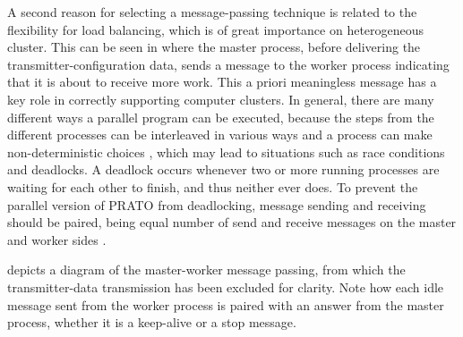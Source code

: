A second reason for selecting a message-passing technique is related
to the flexibility for load balancing, which is of great importance
on heterogeneous cluster. This can be seen in 
where the master process, before delivering the transmitter-configuration
data, sends a message to the worker process indicating that it is
about to receive more work. This a priori meaningless message has
a key role in correctly supporting computer clusters. In general,
there are many different ways a parallel program can be executed,
because the steps from the different processes can be interleaved
in various ways and a process can make non-deterministic choices \cite{Siegel_Verification_of_halting_properties_for_MPI_programs:2007},
which may lead to situations such as race conditions \cite{Clemencon_MPI_Race_detection:1995}
and deadlocks. A deadlock occurs whenever two or more running processes
are waiting for each other to finish, and thus neither ever does.
To prevent the parallel version of PRATO from deadlocking, message
sending and receiving should be paired, being equal number of send
and receive messages on the master and worker sides \cite{Siegel_Verification_of_halting_properties_for_MPI_programs:2007}.

 depicts a diagram of
the master-worker message passing, from which the transmitter-data
transmission has been excluded for clarity. Note how each idle message
sent from the worker process is paired with an answer from the master
process, whether it is a keep-alive or a stop message.

